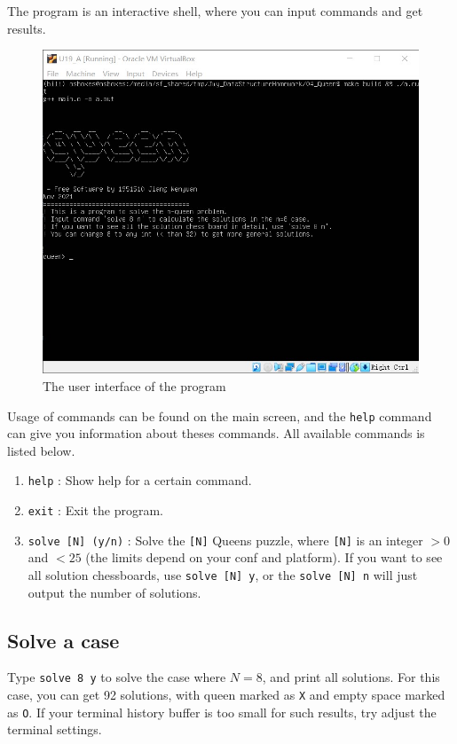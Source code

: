 \documentclass[cn,black,12pt,normal]{elegantnote}
\begin{document}
The program is an interactive shell, where you can input commands and get results.

\begin{figure}[H]
    \centering
    \includegraphics[width=0.7\linewidth]{image/queen_01.jpg}
    \caption{The user interface of the program}
\end{figure}

Usage of commands can be found on the main screen, and the \lstinline{help} command can give you information about theses commands.  All available commands is listed below.

\begin{enumerate}
    \item \lstinline{help} : Show help for a certain command.
    \item \lstinline{exit} : Exit the program.
    \item \lstinline{solve [N] (y/n)} : Solve the \lstinline{[N]} Queens puzzle, where \lstinline{[N]} is an integer $> 0$ and $< 25$ (the limits depend on your conf and platform). If you want to see all solution chessboards, use \lstinline{solve [N] y}, or the \lstinline{solve [N] n} will just output the number of solutions.
\end{enumerate}

\subsection{Solve a case}

Type \lstinline{solve 8 y} to solve the case where $N=8$, and print all solutions. For this case, you can get 92 solutions, with queen marked as \lstinline{X} and empty space marked as \lstinline{O}. If your terminal history buffer is too small for such results, try adjust the terminal settings.
\end{document}
